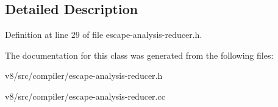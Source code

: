 \subsection{Detailed Description}


Definition at line 29 of file escape-\/analysis-\/reducer.\+h.



The documentation for this class was generated from the following files\+:\begin{DoxyCompactItemize}
\item 
v8/src/compiler/escape-\/analysis-\/reducer.\+h\item 
v8/src/compiler/escape-\/analysis-\/reducer.\+cc\end{DoxyCompactItemize}
